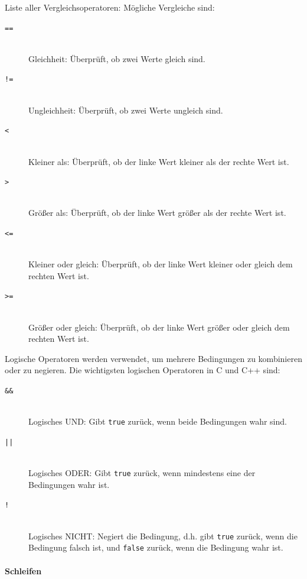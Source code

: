 Liste aller Vergleichsoperatoren:
Mögliche Vergleiche sind:
\begin{description}
    \item[\texttt{==}]\hfill\\
        Gleichheit: Überprüft, ob zwei Werte gleich sind.
    \item[\texttt{!=}]\hfill\\
        Ungleichheit: Überprüft, ob zwei Werte ungleich sind.
    \item[\texttt{<}]\hfill\\
        Kleiner als: Überprüft, ob der linke Wert kleiner als der rechte Wert ist.
    \item[\texttt{>}]\hfill\\
        Größer als: Überprüft, ob der linke Wert größer als der rechte Wert ist.
    \item[\texttt{<=}]\hfill\\
        Kleiner oder gleich: Überprüft, ob der linke Wert kleiner oder gleich dem rechten Wert ist.
    \item[\texttt{>=}]\hfill\\
        Größer oder gleich: Überprüft, ob der linke Wert größer oder gleich dem rechten Wert ist.
\end{description}

Logische Operatoren werden verwendet, um mehrere Bedingungen zu kombinieren oder zu negieren. Die wichtigsten logischen Operatoren in C und C++ sind:
\begin{description}
    \item[\texttt{\&\&}]\hfill\\
        Logisches UND: Gibt \texttt{true} zurück, wenn beide Bedingungen wahr sind.
    \item[\texttt{||}]\hfill\\
        Logisches ODER: Gibt \texttt{true} zurück, wenn mindestens eine der Bedingungen wahr ist.
    \item[\texttt{!}]\hfill\\
        Logisches NICHT: Negiert die Bedingung, d.h. gibt \texttt{true} zurück, wenn die Bedingung falsch ist, und \texttt{false} zurück, wenn die Bedingung wahr ist.
\end{description}   

\paragraph{Schleifen}
\label{sec:referenz:c:schleifen}

